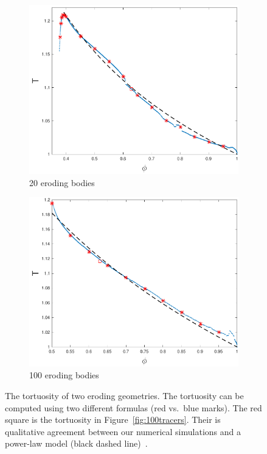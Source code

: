 \documentclass[11pt]{article}
\begin{document}
\begin{figure}[htp]
  \begin{center}
  \begin{subfigure}[b]{0.45\textwidth}
  \includegraphics[width=\textwidth]{figs/tort_eulerian20}
  \caption{20 eroding bodies}
  \end{subfigure}
  \begin{subfigure}[b]{0.45\textwidth}
  \includegraphics[width=\textwidth]{figs/tort_eulerian100}
  \caption{100 eroding bodies}
  \end{subfigure}
  \end{center}

  \caption{\label{fig:100tortuosity} The tortuosity of two eroding
  geometries. The tortuosity can be computed using two different formulas
  (red vs.~blue marks). The red square is the tortuosity in
  Figure~\ref{fig:100tracers}. Their is qualitative agreement between
  our numerical simulations and a power-law model (black dashed
  line)~\cite{mat-kha-koz2008}.}
\end{figure}
\end{document}
